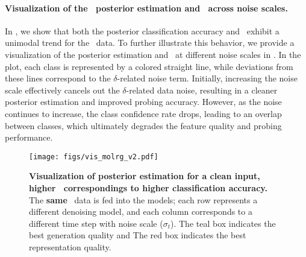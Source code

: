 \paragraph{Visualization of the \MoLRG~posterior estimation and \CSNR~across noise scales.} In , we show that both the posterior classification accuracy and \CSNR~exhibit a unimodal trend for the \MoLRG~data. To further illustrate this behavior, we provide a visualization of the posterior estimation and \CSNR~at different noise scales in . In the plot, each class is represented by a colored straight line, while deviations from these lines correspond to the $\delta$-related noise term. Initially, increasing the noise scale effectively cancels out the $\delta$-related data noise, resulting in a cleaner posterior estimation and improved probing accuracy. However, as the noise continues to increase, the class confidence rate drops, leading to an overlap between classes, which ultimately degrades the feature quality and probing performance.


\begin{figure}[t]
    \centering
    \texttt{[image: figs/vis\_molrg\_v2.pdf]}
    \vspace{-0.1in}
    \caption{\textbf{Visualization of posterior estimation for a clean input, higher \CSNR~correspondings to higher classification accuracy.} The \textbf{same} \MoLRG~data is fed into the models; each row represents a different denoising model, and each column corresponds to a different time step with noise scale ($\sigma_t$). The \textcolor{c1}{teal} box indicates the best generation quality and The \textcolor{c2}{red} box indicates the best representation quality. }
    \label{fig:vis_molrg_3class}
\end{figure}

